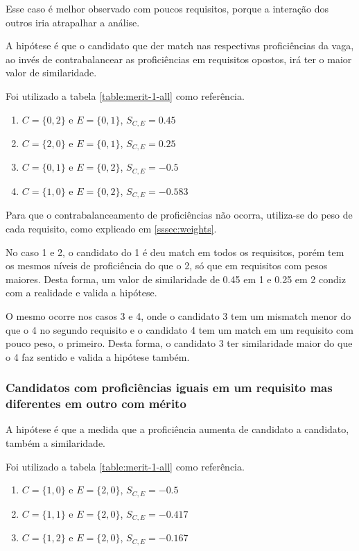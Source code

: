 \documentclass[preprint,12pt]{elsarticle}
\begin{document}
Esse caso é melhor observado com poucos requisitos, porque a interação dos outros iria atrapalhar a análise.

A hipótese é que o candidato que der match nas respectivas proficiências da vaga, ao invés de contrabalancear as proficiências em requisitos opostos, irá ter o maior valor de similaridade.

Foi utilizado a tabela \ref{table:merit-1-all} como referência.

\begin{enumerate}
    \item $C = \{0,2\}$ e $E = \{0,1\}$, $S_{C,E} = 0.45$
    \item $C = \{2,0\}$ e $E = \{0,1\}$, $S_{C,E} = 0.25$
    \item $C = \{0,1\}$ e $E = \{0,2\}$, $S_{C,E} = -0.5$
    \item $C = \{1,0\}$ e $E = \{0,2\}$, $S_{C,E} = -0.583$
\end{enumerate}

Para que o contrabalanceamento de proficiências não ocorra, utiliza-se do peso de cada requisito, como explicado em \ref{sssec:weights}.

No caso 1 e 2, o candidato do 1 é deu match em todos os requisitos, porém tem os mesmos níveis de proficiência do que o 2, só que em requisitos com pesos maiores. Desta forma, um valor de similaridade de 0.45 em 1 e 0.25 em 2 condiz com a realidade e valida a hipótese.

O mesmo ocorre nos casos 3 e 4, onde o candidato 3 tem um mismatch menor do que o 4 no segundo requisito e o candidato 4 tem um match em um requisito com pouco peso, o primeiro. Desta forma, o candidato 3 ter similaridade maior do que o 4 faz sentido e valida a hipótese também.


\subsubsection{Candidatos com proficiências iguais em um requisito mas diferentes em outro com mérito}

A hipótese é que a medida que a proficiência aumenta de candidato a candidato, também a similaridade.

Foi utilizado a tabela \ref{table:merit-1-all} como referência.

\begin{enumerate}
    \item $C = \{1,0\}$ e $E = \{2,0\}$, $S_{C,E} = -0.5$
    \item $C = \{1,1\}$ e $E = \{2,0\}$, $S_{C,E} = -0.417$
    \item $C = \{1,2\}$ e $E = \{2,0\}$, $S_{C,E} = -0.167$
\end{enumerate}
\end{document}
